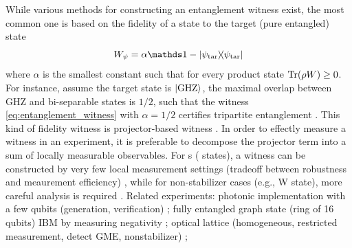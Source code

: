 \documentclass[
aps,
pra,
twocolumn,
floatfix,
]{revtex4-2}
\theoremstyle{plain}
\theoremstyle{definition}
\newtheorem{remark}{Remark}
\newcommand{\ew}{W}
\newcommand{\ob}{O}
\newcommand{\dm}{\rho}
\newcommand{\ghz}{\text{GHZ}}
\newcommand{\target}{\textup{tar}}
\newcommand{\prepare}{\textup{pre}}
\begin{document}
While various methods for constructing an entanglement witness exist, the most common one is based on the fidelity of a state to the target (pure entangled) state
\begin{equation}
	\ew_{\psi} = \alpha\identity - \op{\psi_\target} 
	\label{eq:entanglement_witness}
\end{equation}
where $\alpha$ is the smallest constant such that for every product state $\Tr(\dm\ew)\ge 0$.
For instance, assume the target state is $\ket{\ghz}$,
the maximal overlap between GHZ and bi-separable states is $1/2$,
such that the witness \cref{eq:entanglement_witness} with $\alpha=1/2$ certifies tripartite entanglement
\cite{acinClassificationMixedThreequbit2001}.
This kind of fidelity witness is projector-based witness \cite{bourennaneWitnessingMultipartiteEntanglement2004}.
In order to effectly measure a witness in an experiment, it is preferable to decompose the projector term into a sum of locally measurable observables. 
For s ( states),
a witness can be constructed by very few local measurement settings (tradeoff between robustness and meaurement efficiency) \cite{tothDetectingGenuineMultipartite2005} \cite{tothEntanglementDetectionStabilizer2005} \cite{zhouDetectingMultipartiteEntanglement2019},
while for non-stabilizer cases (e.g., W state), more careful analysis is required \cite{zhangEfficientEntanglementGeneration2021} \cite{zhuMachineLearningDerivedEntanglement2021}.
Related experiments: photonic implementation with a few qubits (generation, verification) \cite{luEntanglementStructureEntanglement2018};
fully entangled graph state (ring of 16 qubits) IBM by measuring negativity \cite{wang16qubitIBMUniversal2018};
optical lattice (homogeneous, restricted measurement, detect GME, nonstabilizer) \cite{zhouSchemeCreateVerify2022};
\end{document}
